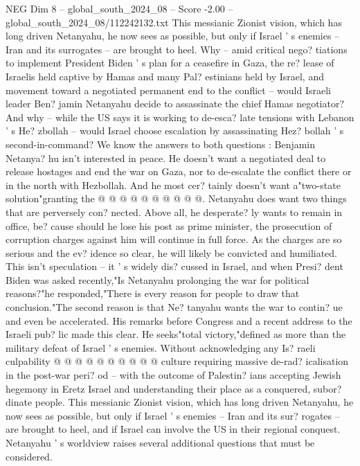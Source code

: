 \begin{textsample}{NEG Dim 8 – global\_south\_2024\_08 – Score -2.00 – global\_south\_2024\_08/112242132.txt}  \label{ex:f8_neg_068}
This messianic Zionist vision, which has long driven Netanyahu, he now sees as possible, but only if Israel ' s enemies -- Iran and its surrogates -- are brought to heel.
Why -- amid critical nego? tiations to implement President Biden ' s plan for a ceasefire in Gaza, the re? lease of Israelis held captive by Hamas and many Pal? estinians held by Israel, and movement toward a negotiated permanent end to the conflict -- would Israeli leader Ben? jamin Netanyahu decide to assassinate the chief Hamas negotiator?
And why -- while the US says it is working to de-esca? late tensions with Lebanon ' s He? zbollah -- would Israel choose escalation by assassinating Hez? bollah ' s second-in-command?
We know the answers to both questions : Benjamin Netanya? hu isn't interested in peace.
He doesn't want a negotiated deal to release hostages and end the war on Gaza, nor to de-escalate the conflict there or in the north with Hezbollah.
And he most cer? tainly doesn't want a"two-state solution"granting the @ @ @ @ @ @ @ @ @ @.
Netanyahu does want two things that are perversely con? nected.
Above all, he desperate? ly wants to remain in office, be? cause should he lose his post as prime minister, the prosecution of corruption charges against him will continue in full force.
As the charges are so serious and the ev? idence so clear, he will likely be convicted and humiliated.
This isn't speculation -- it ' s widely dis? cussed in Israel, and when Presi? dent Biden was asked recently,"Is Netanyahu prolonging the war for political reasons?"he responded,"There is every reason for people to draw that conclusion."The second reason is that Ne? tanyahu wants the war to contin? ue and even be accelerated.
His remarks before Congress and a recent address to the Israeli pub? lic made this clear.
He seeks"total victory,"defined as more than the military defeat of Israel ' s enemies.
Without acknowledging any Is? raeli culpability @ @ @ @ @ @ @ @ @ @ culture requiring massive de-rad? icalisation in the post-war peri? od -- with the outcome of Palestin? ians accepting Jewish hegemony in Eretz Israel and understanding their place as a conquered, subor? dinate people.
This messianic Zionist vision, which has long driven Netanyahu, he now sees as possible, but only if Israel ' s enemies -- Iran and its sur? rogates -- are brought to heel, and if Israel can involve the US in their regional conquest.
Netanyahu ' s worldview raises several additional questions that must be considered.

\end{textsample}
